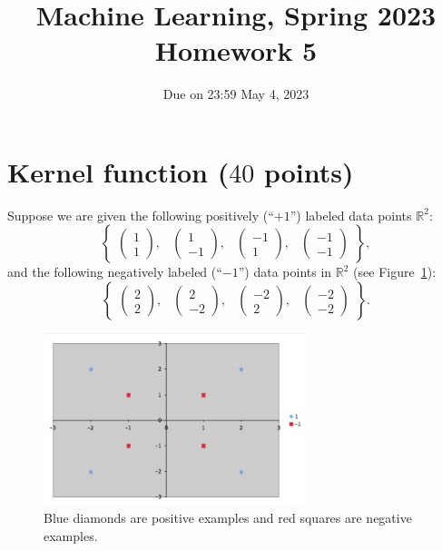 \documentclass[10pt]{article}
\begin{document}
	
\title{Machine Learning, Spring 2023\\Homework 5}
\date{Due on 23:59 May 4, 2023} 
\maketitle


\section{Kernel function ($40$ points)}
Suppose we are given the following positively (``$+1$'') labeled data points $\mathbb{R}^2$:
$$
\begin{Bmatrix}
\begin{pmatrix}
1\\ 
1
\end{pmatrix} ,&
\begin{pmatrix}
1\\ 
-1
\end{pmatrix}  ,&
\begin{pmatrix}
-1\\ 
1
\end{pmatrix} ,&
\begin{pmatrix}
-1\\ 
-1
\end{pmatrix}
\end{Bmatrix},
$$
and the following negatively labeled (``$-1$'') data points in $\mathbb{R}^2$ (see Figure~\ref{fig:svm}):
$$
\begin{Bmatrix}
\begin{pmatrix}
2\\ 
2
\end{pmatrix} ,&
\begin{pmatrix}
2\\ 
-2
\end{pmatrix}  ,&
\begin{pmatrix}
-2\\ 
2
\end{pmatrix} ,&
\begin{pmatrix}
-2\\ 
-2
\end{pmatrix}
\end{Bmatrix}.
$$
\begin{figure}[h!]
	\centering
	\includegraphics[width=3in]{svm.png}
	\caption{Blue diamonds are positive examples and red squares are negative examples.}
	\label{fig:svm}
\end{figure}	
\end{document}
